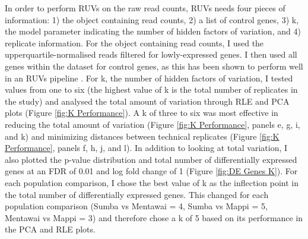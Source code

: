 \documentclass[12pt,a4paper,titlepage,twoside,openright]{book}
\begin{document}
\begin{mainmatter}
{In order to perform RUVs on the raw read counts, RUVs needs four pieces of information: 1) the object containing read counts, 2) a list of control genes, 3) k, the model parameter indicating the number of hidden factors of variation, and 4) replicate information. For the object containing read counts, I used the upperquartile-normalised reads filtered for lowly-expressed genes. I then used all genes within the dataset for control genes, as this has been shown to perform well in an RUVs pipeline \cite{risso2014normalization}. For k, the number of hidden factors of variation, I tested values from one to six (the highest value of k is the total number of replicates in the study) and analysed the total amount of variation through RLE and PCA plots (﻿Figure \ref{fig:K Performance}﻿). A k of three to six was most effective in reducing the total amount of variation (﻿Figure \ref{fig:K Performance}, panels e, g, i, and k) and minimizing distances between technical replicates (﻿Figure \ref{fig:K Performance}, panels f, h, j, and l). In addition to looking at total variation, I also plotted the p-value distribution and total number of differentially expressed genes at an FDR of 0.01 and log fold change of 1 (﻿Figure \ref{fig:DE Genes K}). For each population comparison, I chose the best value of k as the inflection point in the total number of differentially expressed genes. This changed for each population comparison (Sumba vs Mentawai = 4, Sumba vs Mappi = 5, Mentawai vs Mappi = 3) and therefore chose a k of 5 based on its performance in the PCA and RLE plots. 

}
\end{mainmatter}
\end{document}
